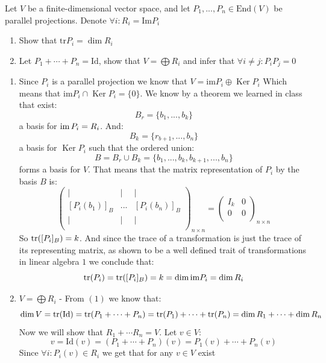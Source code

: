 \documentclass[11pt, a4paper]{article}
\renewcommand{\Im}{\mathrm{im}}
\DeclareMathOperator{\Ker}{Ker}
\begin{document}
\begin{exercise}
  Let $V$ be a finite-dimensional vector space, and let
  $P_1,...,P_n \in \text{End}(V)$ be parallel projections.
  Denote $\forall i\colon R_i = \text{Im}P_i$
  \begin{enumerate}
    \item[(1)] Show that $\text{tr}P_i=\dim R_i$
    \item[(2)] Let $P_1+\cdots+P_n = \text{Id}$, show that 
      $V = \bigoplus R_i$ and infer that $\forall i\neq j \colon P_iP_j = 0$
  \end{enumerate}
\end{exercise}
\begin{solution} \phantom{}
  \begin{enumerate}
    \item[(1)]
  Since $P_i$ is a parallel projection we know that 
  $V = \Im P_i \oplus \Ker P_i$
  Which means that $\Im P_i\cap \Ker P_i = \{0\}$. We know by a theorem
  we learned in class that exist:
  \[ B_r = \{b_1,...,b_k\} \]
  a basis for $\operatorname{im} P_i = R_i$. And:
  \[ B_k = \{r_{b+1},...,b_n\} \]
  a basis for $\Ker P_i$ such that the ordered union:
  \[ B = B_r \cup B_k = \{b_1,...,b_k,b_{k+1},...,b_n\} \]
  forms a basis for $V$. That means that the matrix representation of $P_i$
  by the basis $B$ is:
  \[ 
    \begin{pmatrix}
    \vert & \vert & \vert\\
    [P_i(b_1)]_B & ... & [P_i(b_n)]_B\\
    \vert & \vert & \vert\\
    \end{pmatrix}_{n\times n}
    = 
    \begin{pmatrix}
    I_k & 0\\
    0 & 0\\
    \end{pmatrix}_{n\times n}
  \]
  So $\operatorname{tr} ([P_i]_B) = k$. And since the trace of a transformation is just
  the trace of its representing matrix, as shown to be a well defined trait
  of transformations  in linear algebra $1$ we conclude that:
  \[
    \tr (P_i) = \tr ([P_i]_B) = k = \dim\Im P_i = \dim R_i
  \]
  \item[(2)]
\underline{$V = \bigoplus R_i$} - From $(1)$ we know that:
\[
  \dim V = \operatorname{tr} (\mathrm{Id}) = \operatorname{tr} (P_1+\cdots+P_n) = 
  \operatorname{tr} (P_1) + \cdots + \operatorname{tr}(P_n) = \dim R_1 + \cdots + \dim R_n
\]
Now we will show that $R_1+\cdots R_n = V$. Let $v\in V$:
\[
  v = \mathrm{Id}(v) = (P_1+\cdots+P_n)(v) = P_1(v)+\cdots+P_n(v)
\]
Since $\forall i \colon P_i(v)\in R_i$ we get that for any $v\in V$ exist

\end{enumerate}
\end{solution}
\end{document}
